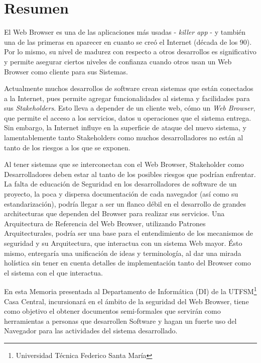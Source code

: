 
\section*{Resumen}
\label{chap:resumen}

El Web Browser es una de las aplicaciones más usadas - \textit{killer app} - y también una de las primeras en aparecer en cuanto se creó el Internet (década de los 90). Por lo mismo, su nivel de madurez con respecto a otros desarrollos es significativo y permite asegurar ciertos niveles de confianza cuando otros usan un Web Browser como cliente para sus Sistemas. 

Actualmente muchos desarrollos de software crean sistemas que están conectados a la Internet, pues permite agregar funcionalidades al sistema y facilidades para sus \textit{Stakeholders}. Esto lleva a depender de un cliente web, cómo un \textit{Web Browser}, que permite el acceso a los servicios, datos u operaciones que el sistema entrega. Sin embargo, la Internet influye en la superficie de ataque del nuevo sistema, y lamentablemente tanto Stakeholders como muchos desarrolladores no están al tanto de los riesgos a los que se exponen.

Al tener sistemas que se interconectan con el Web Browser, Stakeholder como Desarrolladores deben estar al tanto de los posibles riesgos que podrían enfrentar. La falta de educación de Seguridad en los desarrolladores de software de un proyecto, la poca y dispersa documentación de cada navegador (así como su estandarización), podría llegar a ser un flanco débil en el desarrollo de grandes architecturas que dependen del Browser para realizar sus servicios. Una Arquitectura de Referencia del Web Browser, utilizando Patrones Arquitecturales, podría ser una base para el entendimiento de los mecanismos de seguridad y su Arquitectura, que interactua con un sistema Web mayor. Ésto mismo, entregaría una unificación de ideas y terminología, al dar una mirada holística sin tener en cuenta detalles de implementación tanto del Browser como el sistema con el que interactua.

En esta Memoria presentada al Departamento de Informática (DI) de la UTFSM\footnote{Universidad Técnica Federico Santa María} Casa Central, incursionará en el ámbito de la seguridad del Web Browser, tiene como objetivo el obtener documentos semi-formales que servirán como herramientas a personas que desarrollen Software y hagan un fuerte uso del Navegador para las actividades del sistema desarrollado.

